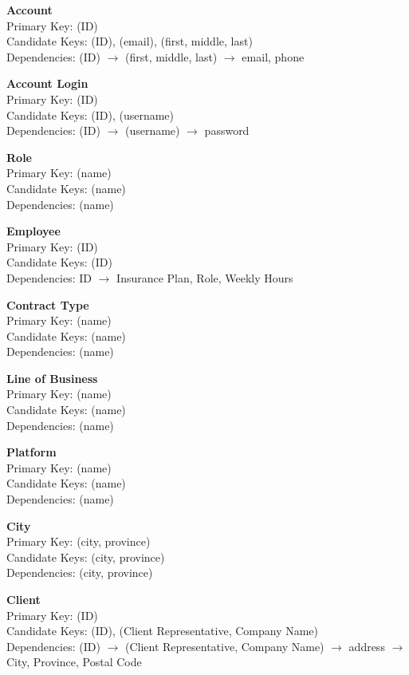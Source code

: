 \documentclass[12pt, letterpaper]{article}
\begin{document}
 

\pagestyle{fancy}
\inputminted{sql}{CMS-SCHEMA-DRAFT-1.sql}
\textbf{Account}\\ 
Primary Key: (ID)\\ 
Candidate Keys: (ID), (email), (first, middle, last)\\ 
Dependencies: (ID) $\rightarrow$ (first, middle, last) $\rightarrow$ email, phone

\textbf{Account Login}\\ 
Primary Key: (ID)\\ 
Candidate Keys: (ID), (username)\\
Dependencies: (ID) $\rightarrow$ (username) $\rightarrow$ password

\textbf{Role}\\ 
Primary Key: (name)\\ 
Candidate Keys: (name)\\
Dependencies: (name)

\textbf{Employee}\\ 
Primary Key: (ID)\\ 
Candidate Keys: (ID)\\
Dependencies: ID $\rightarrow$ Insurance Plan, Role, Weekly Hours

\textbf{Contract Type}\\ 
Primary Key: (name)\\ 
Candidate Keys: (name)\\
Dependencies: (name)

\textbf{Line of Business}\\ 
Primary Key: (name)\\ 
Candidate Keys: (name)\\
Dependencies: (name)

\textbf{Platform}\\ 
Primary Key: (name)\\ 
Candidate Keys: (name)\\
Dependencies: (name)

\textbf{City}\\ 
Primary Key: (city, province)\\ 
Candidate Keys: (city, province)\\
Dependencies: (city, province)

\textbf{Client}\\
Primary Key: (ID)\\
Candidate Keys: (ID), (Client Representative, Company Name)\\
Dependencies: (ID) $\rightarrow$ (Client Representative, Company Name) $\rightarrow$ address $\rightarrow$ City, Province, Postal Code
\end{document}
